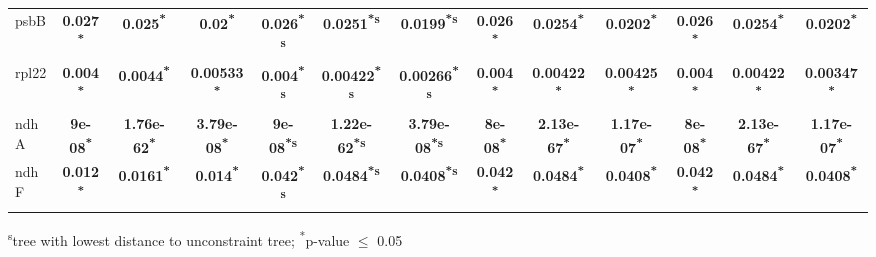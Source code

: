\documentclass[a4paper]{article}
\begin{document}
\begin{longtable}{l|c|c|c|c|c|c|c|c|c|c|c|c}
psbB&\textbf{0.027\textsuperscript{*}}&\textbf{0.025\textsuperscript{*}}&\textbf{0.02\textsuperscript{*}}&\textbf{0.026\textsuperscript{*}\textsuperscript{s}}&\textbf{0.0251\textsuperscript{*}\textsuperscript{s}}&\textbf{0.0199\textsuperscript{*}\textsuperscript{s}}&\textbf{0.026\textsuperscript{*}}&\textbf{0.0254\textsuperscript{*}}&\textbf{0.0202\textsuperscript{*}}&\textbf{0.026\textsuperscript{*}}&\textbf{0.0254\textsuperscript{*}}&\textbf{0.0202\textsuperscript{*}}\\
rpl22&\textbf{0.004\textsuperscript{*}}&\textbf{0.0044\textsuperscript{*}}&\textbf{0.00533\textsuperscript{*}}&\textbf{0.004\textsuperscript{*}\textsuperscript{s}}&\textbf{0.00422\textsuperscript{*}\textsuperscript{s}}&\textbf{0.00266\textsuperscript{*}\textsuperscript{s}}&\textbf{0.004\textsuperscript{*}}&\textbf{0.00422\textsuperscript{*}}&\textbf{0.00425\textsuperscript{*}}&\textbf{0.004\textsuperscript{*}}&\textbf{0.00422\textsuperscript{*}}&\textbf{0.00347\textsuperscript{*}}\\
ndhA&\textbf{9e-08\textsuperscript{*}}&\textbf{1.76e-62\textsuperscript{*}}&\textbf{3.79e-08\textsuperscript{*}}&\textbf{9e-08\textsuperscript{*}\textsuperscript{s}}&\textbf{1.22e-62\textsuperscript{*}\textsuperscript{s}}&\textbf{3.79e-08\textsuperscript{*}\textsuperscript{s}}&\textbf{8e-08\textsuperscript{*}}&\textbf{2.13e-67\textsuperscript{*}}&\textbf{1.17e-07\textsuperscript{*}}&\textbf{8e-08\textsuperscript{*}}&\textbf{2.13e-67\textsuperscript{*}}&\textbf{1.17e-07\textsuperscript{*}}\\
ndhF&\textbf{0.012\textsuperscript{*}}&\textbf{0.0161\textsuperscript{*}}&\textbf{0.014\textsuperscript{*}}&\textbf{0.042\textsuperscript{*}\textsuperscript{s}}&\textbf{0.0484\textsuperscript{*}\textsuperscript{s}}&\textbf{0.0408\textsuperscript{*}\textsuperscript{s}}&\textbf{0.042\textsuperscript{*}}&\textbf{0.0484\textsuperscript{*}}&\textbf{0.0408\textsuperscript{*}}&\textbf{0.042\textsuperscript{*}}&\textbf{0.0484\textsuperscript{*}}&\textbf{0.0408\textsuperscript{*}}\\
\end{longtable}
\textsuperscript{s}tree with lowest distance to unconstraint tree; \textsuperscript{*}p-value $\leq$ 0.05
\end{document}
